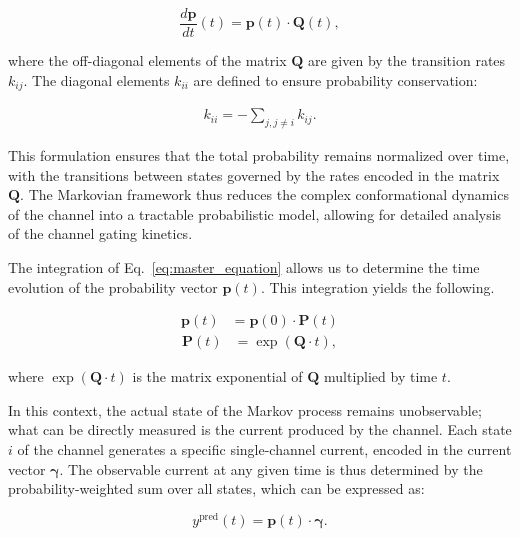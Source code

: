 \documentclass[pdflatex,sn-mathphys-num]{sn-jnl}%
\theoremstyle{thmstyleone}%
\theoremstyle{thmstyletwo}%
\theoremstyle{thmstylethree}%
\begin{document}
\begin{equation}
	\frac{d \boldsymbol{p}}{dt}(t) = \boldsymbol{p}(t) \cdot \boldsymbol{Q}(t),
	\label{eq:master_equation}
\end{equation}

where the off-diagonal elements of the matrix \( \boldsymbol{Q} \) are given by the transition rates \( k_{ij} \). The diagonal elements \( k_{ii} \) are defined to ensure probability conservation:

\begin{align}
	k_{ii} = -\sum_{j, j \neq i} k_{ij}.
	\label{eq:Q_diagonal_element}
\end{align}

This formulation ensures that the total probability remains normalized over time, with the transitions between states governed by the rates encoded in the matrix \( \boldsymbol{Q} \). The Markovian framework thus reduces the complex conformational dynamics of the channel into a tractable probabilistic model, allowing for detailed analysis of the channel gating kinetics.


The integration of Eq.~\ref{eq:master_equation} allows us to determine the time evolution of the probability vector \( \boldsymbol{p}(t) \). This integration yields the following.


\begin{align}
	\boldsymbol{p}(t) &= \boldsymbol{p}(0) \cdot \boldsymbol{P}(t)
	\label{eq:master_equation_solution}
\end{align}
\begin{align}
	\boldsymbol{P} (t) &= \exp(\boldsymbol{Q} \cdot t),
	\label{eq:Transition_Matrix_definition}
\end{align}


where \( \exp(\boldsymbol{Q} \cdot t) \) is the matrix exponential of \( \boldsymbol{Q} \) multiplied by time \( t \). 

In this context, the actual state of the Markov process remains unobservable; what can be directly measured is the current produced by the channel. Each state \( i \) of the channel generates a specific single-channel current, encoded in the current vector \( \boldsymbol{\gamma} \). The observable current at any given time is thus determined by the probability-weighted sum over all states, which can be expressed as:

\begin{equation}
	y^{\text{pred}}(t) = \boldsymbol{p}(t) \cdot \boldsymbol{\gamma}.
	\label{eq:single_channel_prediction}
\end{equation}
\end{document}
